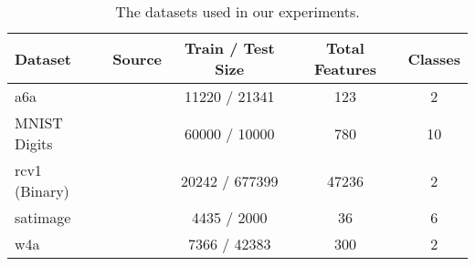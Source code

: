 \begin{table*}[ht]
\caption{The datasets used in our experiments.}
\label{datasets}
\vskip 0.15in
\begin{center}
\begin{small}
\begin{sc}
\begin{tabular}{llccc}
\toprule
Dataset & Source & Train / Test Size & Total Features & Classes\\
\midrule
a6a & \citet{Platt:1999:FTS:299094.299105} & 11220 / 21341 & 123 & 2 \\
MNIST Digits & \citet{726791} & 60000 / 10000 & 780 & 10 \\
rcv1 (Binary) & \citet{Lewis:2004:RNB:1005332.1005345} & 20242 / 677399 & 47236 & 2 \\
satimage & \citet{991427} & 4435 / 2000 & 36 & 6 \\
w4a & \citet{Platt:1999:FTS:299094.299105} & 7366 / 42383 & 300 & 2 \\
\bottomrule
\end{tabular}
\end{sc}
\end{small}
\end{center}
\vskip -0.1in
\end{table*}
